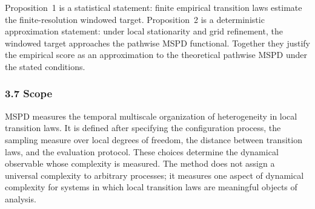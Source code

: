 Proposition~1 is a statistical statement: finite empirical transition laws estimate the finite-resolution windowed target.  Proposition~2 is a deterministic approximation statement: under local stationarity and grid refinement, the windowed target approaches the pathwise MSPD functional.  Together they justify the empirical score as an approximation to the theoretical pathwise MSPD under the stated conditions.

\subsubsection*{3.7 Scope}
\label{method:scope}

MSPD measures the temporal multiscale organization of heterogeneity in local transition laws.  It is defined after specifying the configuration process, the sampling measure over local degrees of freedom, the distance between transition laws, and the evaluation protocol.  These choices determine the dynamical observable whose complexity is measured.  The method does not assign a universal complexity to arbitrary processes; it measures one aspect of dynamical complexity for systems in which local transition laws are meaningful objects of analysis.
